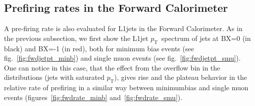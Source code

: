 \documentclass[11pt]{cmspaperpdf}
\newcommand{\pt}{\ensuremath{p_{\textrm{T}}}}
\begin{document}
\newpage
\subsection{Prefiring rates in the Forward Calorimeter}
\label{sec:rates_hf}

A pre-firing rate is also evaluated for L1jets in the Forward Calorimeter. As in the previous subsection, we first show the L1jet \pt~spectrum of jets at BX=0 (in black) and BX=-1 (in red), both for minimum bias events (see fig.~\ref{fig:fwdjetpt_minb}) and single muon events (see fig.~\ref{fig:fwdjetpt_smu}). One can notice in this case, that the effect from the overflow bin in the distributions (jets with saturated \pt), gives rise and the plateau behavior in the relative rate of prefiring in a similar way between minimumbias and single muon events (figures~\ref{fig:fwdrate_minb} and~\ref{fig:fwdrate_smu}).
\end{document}

